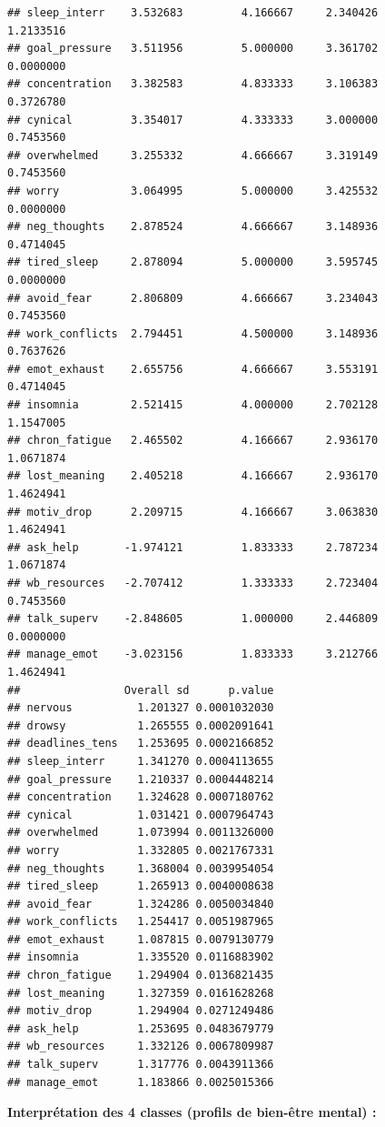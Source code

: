 \documentclass[
]{article}
\begin{document}
\begin{verbatim}
## sleep_interr    3.532683         4.166667     2.340426      1.2133516
## goal_pressure   3.511956         5.000000     3.361702      0.0000000
## concentration   3.382583         4.833333     3.106383      0.3726780
## cynical         3.354017         4.333333     3.000000      0.7453560
## overwhelmed     3.255332         4.666667     3.319149      0.7453560
## worry           3.064995         5.000000     3.425532      0.0000000
## neg_thoughts    2.878524         4.666667     3.148936      0.4714045
## tired_sleep     2.878094         5.000000     3.595745      0.0000000
## avoid_fear      2.806809         4.666667     3.234043      0.7453560
## work_conflicts  2.794451         4.500000     3.148936      0.7637626
## emot_exhaust    2.655756         4.666667     3.553191      0.4714045
## insomnia        2.521415         4.000000     2.702128      1.1547005
## chron_fatigue   2.465502         4.166667     2.936170      1.0671874
## lost_meaning    2.405218         4.166667     2.936170      1.4624941
## motiv_drop      2.209715         4.166667     3.063830      1.4624941
## ask_help       -1.974121         1.833333     2.787234      1.0671874
## wb_resources   -2.707412         1.333333     2.723404      0.7453560
## talk_superv    -2.848605         1.000000     2.446809      0.0000000
## manage_emot    -3.023156         1.833333     3.212766      1.4624941
##                Overall sd      p.value
## nervous          1.201327 0.0001032030
## drowsy           1.265555 0.0002091641
## deadlines_tens   1.253695 0.0002166852
## sleep_interr     1.341270 0.0004113655
## goal_pressure    1.210337 0.0004448214
## concentration    1.324628 0.0007180762
## cynical          1.031421 0.0007964743
## overwhelmed      1.073994 0.0011326000
## worry            1.332805 0.0021767331
## neg_thoughts     1.368004 0.0039954054
## tired_sleep      1.265913 0.0040008638
## avoid_fear       1.324286 0.0050034840
## work_conflicts   1.254417 0.0051987965
## emot_exhaust     1.087815 0.0079130779
## insomnia         1.335520 0.0116883902
## chron_fatigue    1.294904 0.0136821435
## lost_meaning     1.327359 0.0161628268
## motiv_drop       1.294904 0.0271249486
## ask_help         1.253695 0.0483679779
## wb_resources     1.332126 0.0067809987
## talk_superv      1.317776 0.0043911366
## manage_emot      1.183866 0.0025015366
\end{verbatim}

\textbf{Interprétation des 4 classes (profils de bien-être mental) :}
\end{document}
